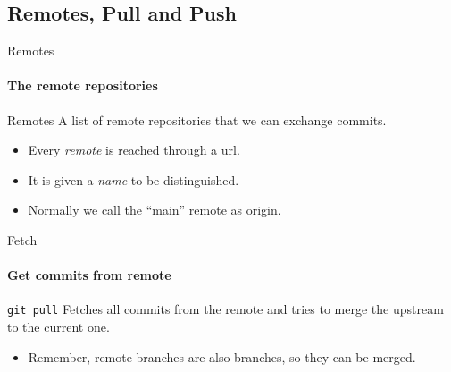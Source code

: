 \documentclass{beamer}
\begin{document}
\subsection{Remotes, Pull and Push}

\begin{frame}{Remotes}
\framesubtitle{The remote repositories}

\begin{block}{Remotes}
	A list of remote repositories that we can exchange commits.
\end{block}

\begin{itemize}
	\item Every \emph{remote} is reached through a url.
	\item It is given a \emph{name} to be distinguished.
	\item Normally we call the ``main'' remote as \alert{origin}.
\end{itemize}

\end{frame}

\begin{frame}{Fetch}
\framesubtitle{Get commits from remote}

\begin{block}{\texttt{git pull}}
	Fetches all commits from the remote and tries to merge the upstream to the current one.
\end{block}

\begin{itemize}
	\item Remember, remote branches are also branches, so they can be merged.
\end{itemize}

\end{frame}
\end{document}
